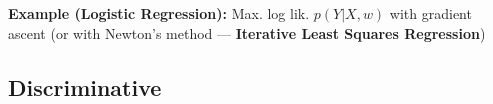 \textbf{Example (Logistic Regression):} Max. log lik. $p(Y|X,w)$ with gradient ascent (or with Newton's method --- \textbf{Iterative Least Squares Regression})

\subsection*{\color{ForestGreen}Discriminative}






